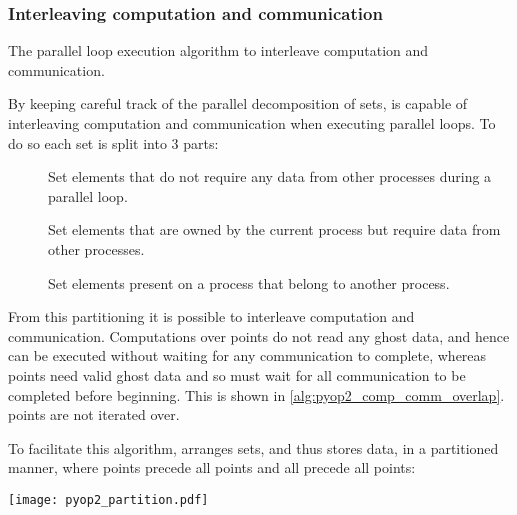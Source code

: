\documentclass[thesis]{subfiles}
\begin{document}
\subsubsection{Interleaving computation and communication}
\label{sec:pyop2_interleave}

\begin{algorithm}
  \caption{The  parallel loop execution algorithm to interleave computation and communication.}
  \begin{algorithmic}[1]
    \State {} 

     
      \State {}
    \EndFor

    \State {} 

     
      \State {}
    \EndFor
  \end{algorithmic}
  \label{alg:pyop2_comp_comm_overlap}
\end{algorithm}

By keeping careful track of the parallel decomposition of sets,  is capable of interleaving computation and communication when executing parallel loops.
To do so each set is split into 3 parts:
\begin{description}
  \item[\coreiter{}]
    Set elements that do not require any data from other processes during a parallel loop.
  \item[\ownediter{}]
    Set elements that are owned by the current process but require data from other processes.
  \item[\ghostiter{}]
    Set elements present on a process that belong to another process.
\end{description}
From this partitioning it is possible to interleave computation and communication.
Computations over \coreiter{} points do not read any ghost data, and hence can be executed without waiting for any communication to complete, whereas \ownediter{} points need valid ghost data and so must wait for all communication to be completed before beginning.
This is shown in \cref{alg:pyop2_comp_comm_overlap}.
\ghostiter{} points are not iterated over.

To facilitate this algorithm,  arranges sets, and thus stores data, in a partitioned manner, where \coreiter{} points precede all \ownediter{} points and all \ownediter{} precede all \ghostiter{} points:
\begin{center}
  \texttt{[image: pyop2\_partition.pdf]}
\end{center}
\end{document}
